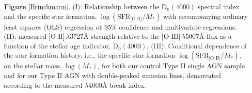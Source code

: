 \label{Brinchmann} \textbf{Figure} \ref{Brinchmann}. (I): Relationship between the $\text{D}_{n}(4000)$ spectral index and the specific star formation, $\log{(\text{SFR}_{\text{[O II]}}/M_{*})}$ with accompanying ordinary least squares (OLS) regression at 95\% confidence and multivariate regressions.  (II): measured $\text{[O II]}\,\lambda{3727}Å$ strength relative to the $\text{[O III]}\,\lambda{5007}Å$ flux as a function of the stellar age indicator, $\text{D}_{n}(4000)$. (III): Conditional dependence of the star formation history, i.e., the specific star formation $\log{(\text{SFR}_{\text{[O II]}}/M_{*})}$, on the stellar mass, $\log{(M_{*})}$, for both our control Type II single AGN sample and for our Type II AGN with double-peaked emission lines, demarcated according to the measured $\lambda{4000}Å$ break index.
  